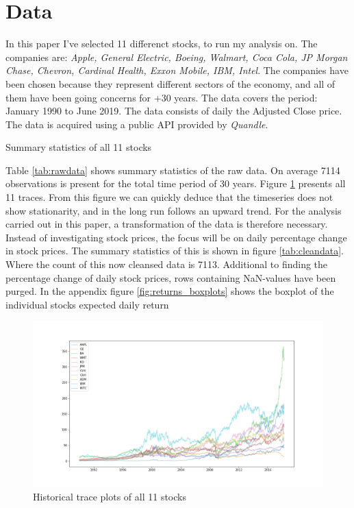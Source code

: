 \section{Data} \label{sec:data}


In this paper I've selected 11 differenct stocks, to run my analysis on. The companies are:
\textit{Apple, General Electric, Boeing, Walmart, Coca Cola, JP Morgan Chase, Chevron, Cardinal Health, Exxon Mobile, IBM, Intel}. The companies have been chosen because they represent different sectors of the economy, and all of them have been going concerns for +30 years. The data covers the period: January 1990 to June 2019. The data consists of daily the Adjusted Close price. The data is acquired using a public API provided by \textit{Quandle}.

\begin{table}[ht]
\centering
\caption{Summary statistics of all 11 stocks}

\label{tab:rawdata}
\end{table}

Table \ref{tab:rawdata} shows summary statistics of the raw data. On average 7114 observations is present for the total time period of 30 years. Figure \ref{fig:historicaltraces} presents all 11 traces. From this figure we can quickly deduce that the timeseries does not show stationarity, and in the long run follows an upward trend. For the analysis carried out in this paper, a transformation of the data is therefore necessary.
Instead of investigating stock prices, the focus will be on daily percentage change in stock prices. The summary statistics of this is shown in figure \ref{tab:cleandata}. Where the count of this now cleansed data is 7113. Additional to finding the percentage change of daily stock prices, rows containing NaN-values have been purged. In the appendix figure \ref{fig:returns_boxplots} shows the boxplot of the individual stocks expected daily return

\begin{figure}[ht]
\centering
\includegraphics[scale=0.45]{figures/historicaltraces.png}
\caption{Historical trace plots of all 11 stocks}
\label{fig:historicaltraces}
\end{figure}

